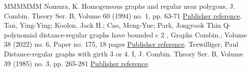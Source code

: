 \documentclass[11pt]{article}
\theoremstyle{definition}
\numberwithin{equation}{section}
\numberwithin{equation}{section}
\begin{document}
\begin{thebibliography}{MMMMMM}
 Nomura, K. Homogeneous graphs and regular near polygons, J. Combin. Theory Ser. B, Volume 60 (1994) no. 1, pp. 63-71 \href{https://alco.centre-mersenne.org/articles/10.5802/alco.454/#Nomura1994}{Publisher reference}.
 Tan, Ying-Ying; Koolen, Jack H.; Cao, Meng-Yue; Park, Jongyook Thin Q-polynomial distance-regular graphs have bounded c 2 , Graphs Combin., Volume 38 (2022) no. 6, Paper no. 175, 18 pages \href{https://alco.centre-mersenne.org/articles/10.5802/alco.454/#TKCP2022}{Publisher reference}.
 Terwilliger, Paul Distance-regular graphs with girth 3 or 4. I, J. Combin. Theory Ser. B, Volume 39 (1985) no. 3, pp. 265-281 \href{https://alco.centre-mersenne.org/articles/10.5802/alco.454/#Terwilliger1985}{Publisher reference}.
\end{thebibliography}
\end{document}
